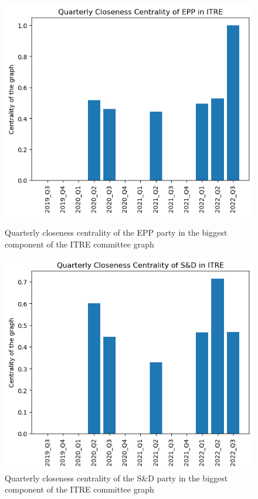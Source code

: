 \documentclass[lettersize,journal]{IEEEtran}
\begin{document}
\begin{figure}[h]
  \centering
  \begin{minipage}[b]{0.23\textwidth}
    \includegraphics[width=\textwidth]{EPP_ITRE_Q_closeness_BIG.png}
    \caption{Quarterly closeness centrality of the EPP party in the biggest component of the ITRE committee graph}
    \label{EPP_ITRE_Q_closeness_BIG}
  \end{minipage}
  \hfill
  \begin{minipage}[b]{0.23\textwidth}
    \includegraphics[width=\textwidth]{S&D_ITRE_Q_closeness_BIG.png}
    \caption{Quarterly closeness centrality of the S\&D party in the  biggest component of the ITRE committee graph}
    \label{S&D_ITRE_Q_closeness_BIG}
  \end{minipage}
\end{figure}
\end{document}
